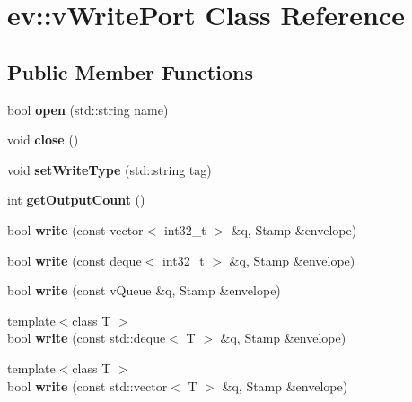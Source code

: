 \hypertarget{classev_1_1vWritePort}{}\section{ev\+:\+:v\+Write\+Port Class Reference}
\label{classev_1_1vWritePort}
\subsection*{Public Member Functions}
\begin{DoxyCompactItemize}
\item 
\mbox{\label{classev_1_1vWritePort_a2ae9d0799444e6b08a2741632ca2a844}} 
bool {\bfseries open} (std\+::string name)
\item 
\mbox{\label{classev_1_1vWritePort_a8657bd358f9714f5c183ba3038f1e672}} 
void {\bfseries close} ()
\item 
\mbox{\label{classev_1_1vWritePort_aaf5570455ab1a10e33005ea195f01212}} 
void {\bfseries set\+Write\+Type} (std\+::string tag)
\item 
\mbox{\label{classev_1_1vWritePort_a82bdfad9b345a33f3458c82c65e62305}} 
int {\bfseries get\+Output\+Count} ()
\item 
\mbox{\label{classev_1_1vWritePort_a30e8556f5ab495ec11cb5f595d0fc679}} 
bool {\bfseries write} (const vector$<$ int32\+\_\+t $>$ \&q, Stamp \&envelope)
\item 
\mbox{\label{classev_1_1vWritePort_ae90dc683d47992ea2374237c130f057b}} 
bool {\bfseries write} (const deque$<$ int32\+\_\+t $>$ \&q, Stamp \&envelope)
\item 
\mbox{\label{classev_1_1vWritePort_aa3a656f3748b036cf2a632d9591c13f3}} 
bool {\bfseries write} (const v\+Queue \&q, Stamp \&envelope)
\item 
\mbox{\label{classev_1_1vWritePort_a4accfe5230b426f9b863e481d8fb3c6c}} 
{\footnotesize template$<$class T $>$ }\\bool {\bfseries write} (const std\+::deque$<$ T $>$ \&q, Stamp \&envelope)
\item 
\mbox{\label{classev_1_1vWritePort_a1fbcfd268af4278ae3d778b5c1b0284a}} 
{\footnotesize template$<$class T $>$ }\\bool {\bfseries write} (const std\+::vector$<$ T $>$ \&q, Stamp \&envelope)
\end{DoxyCompactItemize}

